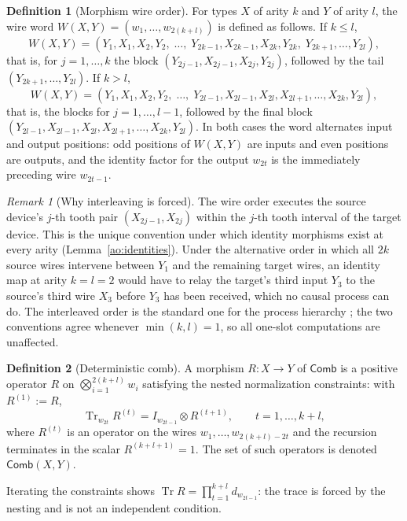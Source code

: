 \documentclass[11pt,a4paper]{article}
\theoremstyle{definition}
\newtheorem{definition}{Definition}[section]
\theoremstyle{plain}
\theoremstyle{remark}
\newtheorem{remark}[theorem]{Remark}
\DeclareMathOperator{\Tr}{Tr}
\newcommand{\Comb}{\mathsf{Comb}}
\begin{document}
\begin{definition}[Morphism wire order]
\label{ao:wireorder}
For types $X$ of arity $k$ and $Y$ of arity $l$, the wire word
$W(X,Y)=(w_1,\dots,w_{2(k+l)})$ is defined as follows. If $k\le l$,
\[
W(X,Y)=(Y_1,X_1,X_2,Y_2,\;\dots,\;Y_{2k-1},X_{2k-1},X_{2k},Y_{2k},
\;Y_{2k+1},\dots,Y_{2l}),
\]
that is, for $j=1,\dots,k$ the block $(Y_{2j-1},X_{2j-1},X_{2j},Y_{2j})$,
followed by the tail $(Y_{2k+1},\dots,Y_{2l})$. If $k>l$,
\[
W(X,Y)=(Y_1,X_1,X_2,Y_2,\;\dots,\;Y_{2l-1},X_{2l-1},X_{2l},
X_{2l+1},\dots,X_{2k},Y_{2l}),
\]
that is, the blocks for $j=1,\dots,l-1$, followed by the final block
$(Y_{2l-1},X_{2l-1},X_{2l},X_{2l+1},\dots,X_{2k},Y_{2l})$.
In both cases the word alternates input and output positions: odd positions
of $W(X,Y)$ are inputs and even positions are outputs, and the identity
factor for the output $w_{2t}$ is the immediately preceding wire $w_{2t-1}$.
\end{definition}

\begin{remark}[Why interleaving is forced]
\label{ao:why-interleave}
The wire order executes the source device's $j$-th tooth pair
$(X_{2j-1},X_{2j})$ within the $j$-th tooth interval of the target device.
This is the unique convention under which identity morphisms exist at every
arity (Lemma~\ref{ao:identities}). Under the alternative order in which all
$2k$ source wires intervene between $Y_1$ and the remaining target wires, an
identity map at arity $k=l=2$ would have to relay the target's third input
$Y_3$ to the source's third wire $X_3$ before $Y_3$ has been received, which
no causal process can do. The interleaved order is the standard one for the
process hierarchy \cite{chiribella2013,bisioperinotti2019}; the two conventions
agree whenever $\min(k,l)=1$, so all one-slot computations are unaffected.
\end{remark}

\begin{definition}[Deterministic comb]
\label{ao:detcomb}
A morphism $R:X\to Y$ of $\Comb$ is a positive operator $R$ on
$\bigotimes_{i=1}^{2(k+l)} w_i$ satisfying the nested normalization
constraints: with $R^{(1)}:=R$,
\[
\Tr_{w_{2t}} R^{(t)} = I_{w_{2t-1}}\otimes R^{(t+1)},
\qquad t=1,\dots,k+l,
\]
where $R^{(t)}$ is an operator on the wires $w_1,\dots,w_{2(k+l)-2t}$ and
the recursion terminates in the scalar $R^{(k+l+1)}=1$. The set of such
operators is denoted $\Comb(X,Y)$.
\end{definition}

Iterating the constraints shows $\Tr R=\prod_{t=1}^{k+l} d_{w_{2t-1}}$: the
trace is forced by the nesting and is not an independent condition.
\end{document}

